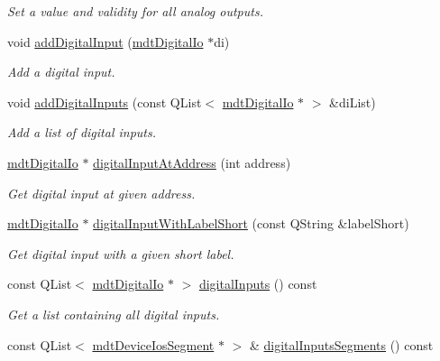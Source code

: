 \begin{DoxyCompactItemize}
\begin{DoxyCompactList}\small\item\em Set a value and validity for all analog outputs. \end{DoxyCompactList}\item 
void \hyperlink{classmdt_device_ios_a023571f5d77bd0874c08b53890a56381}{addDigitalInput} (\hyperlink{classmdt_digital_io}{mdtDigitalIo} $\ast$di)
\begin{DoxyCompactList}\small\item\em Add a digital input. \end{DoxyCompactList}\item 
void \hyperlink{classmdt_device_ios_a470c27db1fefa6cd2a4a690bb0ff04f5}{addDigitalInputs} (const QList$<$ \hyperlink{classmdt_digital_io}{mdtDigitalIo} $\ast$ $>$ \&diList)
\begin{DoxyCompactList}\small\item\em Add a list of digital inputs. \end{DoxyCompactList}\item 
\hyperlink{classmdt_digital_io}{mdtDigitalIo} $\ast$ \hyperlink{classmdt_device_ios_a9df04d579a6642e5cf717c792cba34f9}{digitalInputAtAddress} (int address)
\begin{DoxyCompactList}\small\item\em Get digital input at given address. \end{DoxyCompactList}\item 
\hyperlink{classmdt_digital_io}{mdtDigitalIo} $\ast$ \hyperlink{classmdt_device_ios_abcde6de5a0ca6d642af04c21250d6555}{digitalInputWithLabelShort} (const QString \&labelShort)
\begin{DoxyCompactList}\small\item\em Get digital input with a given short label. \end{DoxyCompactList}\item 
const QList$<$ \hyperlink{classmdt_digital_io}{mdtDigitalIo} $\ast$ $>$ \hyperlink{classmdt_device_ios_adb2cbcd4adcee1e9434634694ee1ae24}{digitalInputs} () const 
\begin{DoxyCompactList}\small\item\em Get a list containing all digital inputs. \end{DoxyCompactList}\item 
\hypertarget{classmdt_device_ios_adc81519c2e6edc7fe54663c77d6eb503}{
const QList$<$ \hyperlink{classmdt_device_ios_segment}{mdtDeviceIosSegment} $\ast$ $>$ \& \hyperlink{classmdt_device_ios_adc81519c2e6edc7fe54663c77d6eb503}{digitalInputsSegments} () const }
\label{classmdt_device_ios_adc81519c2e6edc7fe54663c77d6eb503}


\end{DoxyCompactItemize}
